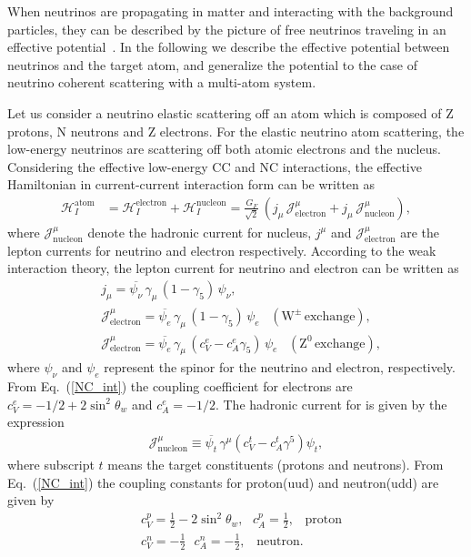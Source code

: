 When neutrinos are propagating in matter and interacting with the background particles, they can be described by the picture of free neutrinos traveling in an effective potential~\cite{Wolfenstein:1977ue}. In the following we describe the effective potential between neutrinos and the target atom, and generalize the potential to the case of neutrino coherent scattering with a multi-atom system.


Let us consider a neutrino elastic scattering off an atom which is composed of Z protons, N neutrons and Z electrons. For the elastic neutrino atom scattering, the low-energy neutrinos are scattering off both atomic electrons and the nucleus. Considering the effective low-energy CC and NC interactions, the effective Hamiltonian in current-current interaction form can be written as 
\begin{align}
\label{H_atom}
\mathcal{H}_I^{\mathrm{atom}}&=\mathcal{H}^\mathrm{electron}_I+\mathcal{H}^\mathrm{nucleon}_I=\frac{G_F}{\sqrt{2}}\,\left(j_\mu\,\mathcal{J}^\mu_{\mathrm{electron}}+j_\mu\,\mathcal{J}^\mu_\mathrm{nucleon}\right),
\end{align}
where $\mathcal{J}^\mu_{\mathrm{nucleon}}$ denote the hadronic current for nucleus, $j^\mu$ and $\mathcal{J}^\mu_{\mathrm{electron}}$ are the lepton currents for neutrino and electron respectively. According to the weak interaction theory, the lepton current for neutrino and  electron can be written as
\begin{align}
&j_\mu=\overline{\psi_{\nu}}\,\gamma_\mu\,\left(1-\gamma_5\right)\,\psi_\nu,\\
\label{Current_e}
&\mathcal{J}^\mu_{\mathrm{electron}}=\overline{\psi_{e}}\,\gamma_\mu\,\left(1-\gamma_5\right)\,\psi_e\,\,\,\,\,(\mathrm{W^\pm\,exchange}),\\
&\mathcal{J}^\mu_{\mathrm{electron}}=\overline{\psi_{e}}\,\gamma_\mu\,\left(c_V^e-c_A^e\gamma_5\right)\,\psi_e\,\,\,\,\,(\mathrm{Z^0\,exchange}),
\end{align}
where  $\psi_\nu$ and $\psi_e$ represent the spinor for the neutrino and electron, respectively. From Eq.~(\ref{NC_int}) the coupling coefficient for electrons are $c^e_V=-1/2+2\sin^2\theta_w$ and $c^e_A=-1/2$. The hadronic current for is given by the expression~\cite{Giunti:2007ry}
\begin{align}
\label{Current_h}
\mathcal{J}^\mu_\mathrm{nucleon}\equiv\overline{\psi_t}\,\gamma^\mu\left(c^t_V-c^t_A\gamma^5\right)\psi_t,
\end{align}
where subscript $t$ means the target constituents (protons and neutrons). From Eq.~(\ref{NC_int}) the coupling constants for proton(uud) and neutron(udd) are given by
\begin{align}
&c^p_V=\frac{1}{2}-2\sin^2\theta_w,\,\,\,\,c^p_A=\frac{1}{2},\,\,\,\,\,\mathrm{proton}\\
&c^n_V=-\frac{1}{2}\,\,\,\,c^n_A=-\frac{1}{2},\,\,\,\,\,\mathrm{neutron}.
\end{align}



